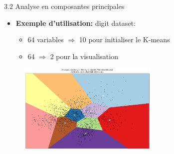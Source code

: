 \begin{frame}{3.2 Analyse en composantes principales}
  \begin{itemize}
  \item \textbf{Exemple d'utilisation:} digit dataset:
    \begin{itemize}
      \normalsize
    \item 64 variables $\Rightarrow$ 10 pour initialiser le K-means
    \item 64 $\Rightarrow$ 2 pour la visualisation
    \end{itemize}
  \end{itemize}
  \begin{figure}
    \includegraphics[width=0.6\textwidth]{figs/PCA.png}
  \end{figure}
\end{frame}
